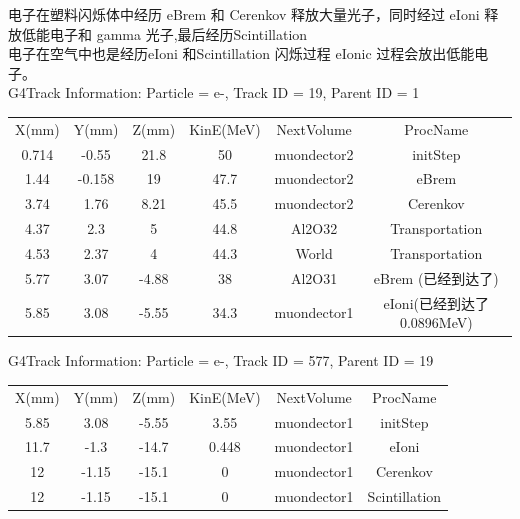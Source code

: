\documentclass[UTF8]{ctexart}
\begin{document}
电子在塑料闪烁体中经历 eBrem 和 Cerenkov 释放大量光子，同时经过 eIoni 释放低能电子和 gamma 光子,最后经历Scintillation\\

电子在空气中也是经历eIoni 和Scintillation 闪烁过程 eIonic 过程会放出低能电子。\\

G4Track Information:   Particle = e-,   Track ID = 19,   Parent ID = 1\\

\begin{center}
\begin{tabular}{|c|c|c|c|c|c|}

X(mm)  &  Y(mm)  &  Z(mm) & KinE(MeV)  &  NextVolume & ProcName\\
0.714  &  -0.55   &  21.8 &    50  &    muondector2 & initStep\\
1.44  &  -0.158    &   19     &  47.7   & muondector2 & eBrem\\
3.74   &   1.76  &   8.21   &   45.5     &  muondector2 & Cerenkov\\
4.37    & 2.3 &  5  &  44.8   &     Al2O32  & Transportation\\
4.53  &   2.37  &  4 & 44.3  &     World & Transportation\\
5.77  &  3.07  & -4.88   &  38   &  Al2O31 & eBrem (已经到达了)\\
5.85  & 3.08 & -5.55  &   34.3   &  muondector1 & eIoni(已经到达了 0.0896MeV)\\
\end{tabular}
\end{center}


G4Track Information:   Particle = e-,   Track ID = 577,   Parent ID = 19\\

\begin{center}
\begin{tabular}{|c|c|c|c|c|c|}
X(mm)  &  Y(mm)  &  Z(mm) & KinE(MeV)  &  NextVolume & ProcName\\
5.85  & 3.08  &  -5.55    &  3.55    & muondector1  & initStep\\
11.7  &  -1.3 & -14.7    &   0.448    & muondector1 & eIoni\\
12 & -1.15 & -15.1   &    0   &  muondector1  & Cerenkov\\
 12  & -1.15  & -15.1    &   0     &  muondector1  & Scintillation

\end{tabular}
\end{center}
\end{document}
